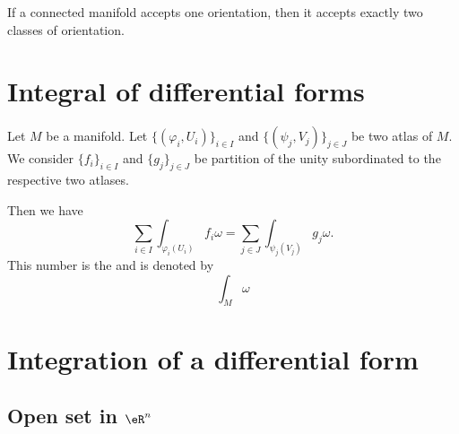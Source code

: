 \begin{proposition}		\label{PROPooNCNJooHFngBW}
	If a connected manifold accepts one orientation, then it accepts exactly two classes of orientation.
\end{proposition}

\section{Integral of differential forms}

\begin{propositionDef}       \label{DEFooOMQLooGiJWZS}

	Let \( M\) be a manifold. Let \(  \{ (\varphi_i,U_i) \}_{i\in I}\) and \( \{ (\psi_j,V_j) \}_{j\in J}\) be two atlas of \( M\). We consider \( \{ f_i \}_{i\in I}\) and \( \{ g_j \}_{j\in J}\) be partition of the unity subordinated to the respective two atlases.

	Then we have
	\begin{equation}
		\sum_{i\in I}\int_{\varphi_i(U_i)}f_i\omega=\sum_{j\in J}\int_{\psi_j(V_j)}g_j\omega.
	\end{equation}
	This number is the  and is denoted by
	\begin{equation}
		\int_M\omega
	\end{equation}
\end{propositionDef}


\section{Integration of a differential form}

\subsection{Open set in \( \eR^n\)}

